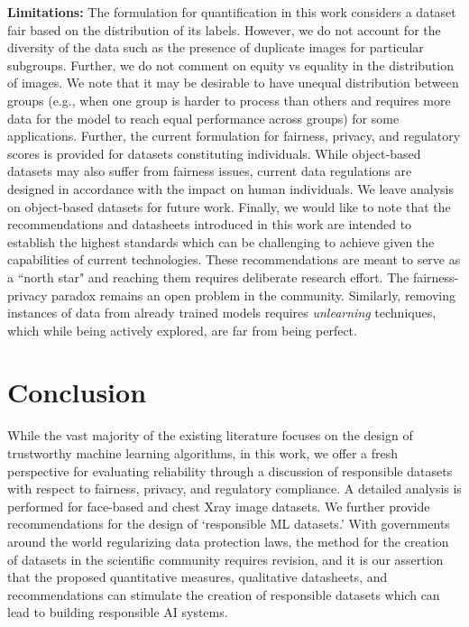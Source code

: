 \documentclass[journal]{IEEEtran}
\begin{document}
\noindent \textbf{Limitations:} The formulation for quantification in this work considers a dataset fair based on the distribution of its labels.  However, we do not account for the diversity of the data such as the presence of duplicate images for particular subgroups. Further, we do not comment on equity vs equality in the distribution of images. We note that it may be desirable to have unequal distribution between groups (e.g., when one group is harder to process than others and requires more data for the model to reach equal performance across groups) for some applications. Further, the current formulation for fairness, privacy, and regulatory scores is provided for datasets constituting individuals. While object-based datasets may also suffer from fairness issues, current data regulations are designed in accordance with the impact on human individuals. We leave analysis on object-based datasets for future work. Finally, we would like to note that the recommendations and datasheets introduced in this work are intended to establish the highest standards which can be challenging to achieve given the capabilities of current technologies. These recommendations are meant to serve as a ``north star" and reaching them requires deliberate research effort. The fairness-privacy paradox remains an open problem in the community. Similarly, removing instances of data from already trained models requires \textit{unlearning} techniques, which while being actively explored, are far from being perfect.

\section{Conclusion}

While the vast majority of the existing literature focuses on the design of trustworthy machine learning algorithms, in this work, we offer a fresh perspective for evaluating reliability through a discussion of responsible datasets with respect to fairness, privacy, and regulatory compliance. A detailed analysis is performed  for face-based and chest Xray image datasets. We further provide recommendations for the design of `responsible ML datasets.' With governments around the world regularizing data protection laws, the method for the creation of datasets in the scientific community requires revision, and it is our assertion that the proposed quantitative measures, qualitative datasheets, and recommendations can stimulate the creation of responsible datasets which can lead to building responsible AI systems.
\end{document}
